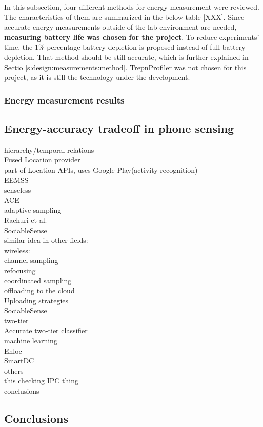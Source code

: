 In this subsection, four different methods for energy measurement were reviewed. The characteristics of them are summarized in the below table [XXX]. Since accurate energy measurements outside of the lab environment are needed, \textbf{measuring battery life was chosen for the project}.  To reduce experiments' time, the 1\% percentage battery depletion is proposed instead of full battery depletion. That method should be still accurate, which is further explained in Sectio \ref{s:design:measurements:method}. TrepnProfiler was not chosen for this project, as it is still the technology under the development.

\subsubsection{Energy measurement results}
\cite{benabdesslem:senseless} \cite{constandache:localization} \cite{wang:eemss} \cite{chon:smartdc}
	
\subsection{Energy-accuracy tradeoff in phone sensing}
hierarchy/temporal relations\\
	Fused Location provider\cite{android:locationapi}\\
		part of Location APIs, uses Google Play(activity recognition)\\
	EEMSS \cite{wang:eemss}\\
	senseless \cite{benabdesslem:senseless}\\
	ACE \cite{nath:ace}\\

adaptive sampling\\
	Rachuri et al. \cite{rachuri:dynamicsensing}\\
	SociableSense \cite{rachuri:socialsense} \\
	similar idea in other fields:\\
		wireless:\\
			channel sampling \cite{deshpande:channeling}\\
			refocusing \cite{deshpande:refocusing}\\
			coordinated sampling \cite{deshpande:coordinated}\\

offloading to the cloud\\
	Uploading strategies \cite{musolesi:offloading}\\
	SociableSense \cite{rachuri:socialsense} \\
	
two-tier\\
	Accurate two-tier classifier \cite{srinivasan:twotier}\\

machine learning\\
	Enloc \cite{constandache:enloc}\\
	SmartDC \cite{chon:smartdc}\\

others\\
	this checking IPC thing\\

conclusions

\subsection{Conclusions}
